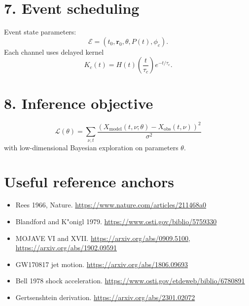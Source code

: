 \documentclass[11pt]{article}
\begin{document}
\section{7. Event scheduling}
Event state parameters:
\[
\mathcal E=(t_0,\mathbf r_0,\theta, P(t),\phi_c).
\]
Each channel uses delayed kernel
\[
K_c(t)=H(t)\left(\frac{t}{\tau_c}\right)e^{-t/\tau_c}.
\]

\section{8. Inference objective}
\[
\mathcal L(\theta)=\sum_{\nu,t}\frac{(X_\mathrm{model}(t,\nu;\theta)-X_\mathrm{obs}(t,\nu))^2}{\sigma^2}
\]
with low-dimensional Bayesian exploration on parameters $\theta$.

\section{Useful reference anchors}
\begin{itemize}
\item Rees 1966, Nature. \url{https://www.nature.com/articles/211468a0}
\item Blandford and K"onigl 1979. \url{https://www.osti.gov/biblio/5759330}
\item MOJAVE VI and XVII. \url{https://arxiv.org/abs/0909.5100}, \url{https://arxiv.org/abs/1902.09591}
\item GW170817 jet motion. \url{https://arxiv.org/abs/1806.09693}
\item Bell 1978 shock acceleration. \url{https://www.osti.gov/etdeweb/biblio/6780891}
\item Gertsenshtein derivation. \url{https://arxiv.org/abs/2301.02072}
\end{itemize}
\end{document}
